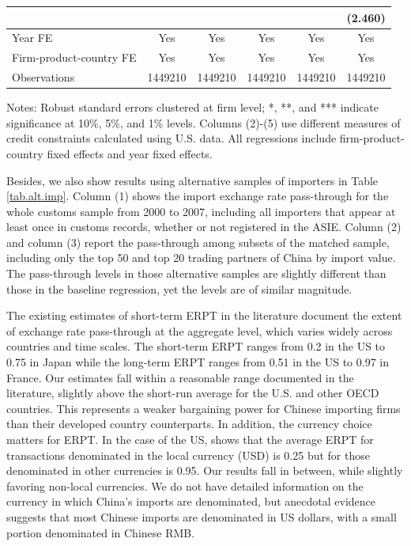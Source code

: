 \begin{table}[H]
\begin{threeparttable}
\begin{tabular}{lccccc}
			&   &    &   &       & (2.460) \\
                \midrule
			Year FE  & Yes & Yes   & Yes   & Yes   & Yes \\
			Firm-product-country FE & Yes & Yes   & Yes   & Yes   & Yes \\
			Observations & 1449210 & 1449210 & 1449210 & 1449210 & 1449210 \\
			\bottomrule
		\end{tabular}
		\begin{tablenotes}
			\footnotesize
			\item Notes: Robust standard errors clustered at firm level;  *, **, and *** indicate significance at 10\%, 5\%, and 1\% levels. Columns (2)-(5) use different measures of credit constraints calculated using U.S. data. All regressions include firm-product-country fixed effects and year fixed effects.
		\end{tablenotes}
	\end{threeparttable}
	\label{tab.credit}
\end{table}


Besides, we also show results using alternative samples of importers in Table \ref{tab.alt.imp}. Column (1) shows the import exchange rate pass-through for the whole customs sample from 2000 to 2007, including all importers that appear at least once in customs records, whether or not registered in the ASIE. Column (2) and column (3) report the pass-through among subsets of the matched sample, including only the top 50 and top 20 trading partners of China by import value. The pass-through levels in those alternative samples are slightly different than those in the baseline regression, yet the levels are of similar magnitude.

The existing estimates of short-term ERPT in the literature \citep{burstein2014international} document the extent of exchange rate pass-through at the aggregate level, which varies widely across countries and time scales. The short-term ERPT ranges from 0.2 in the US to 0.75 in Japan while the long-term ERPT ranges from 0.51 in the US to 0.97 in France. Our estimates fall within a reasonable range documented in the literature, slightly above the short-run average for the U.S. and other OECD countries. This represents a weaker bargaining power for Chinese importing firms than their developed country counterparts. In addition, the currency choice matters for ERPT. In the case of the US, \citep{gopinath2010-currency} shows that the average ERPT for transactions denominated in the local currency (USD) is 0.25 but for those denominated in other currencies is 0.95. Our results fall in between, while slightly favoring non-local currencies. We do not have detailed information on the currency in which China's imports are denominated, but anecdotal evidence suggests that most Chinese imports are denominated in US dollars, with a small portion denominated in Chinese RMB.

